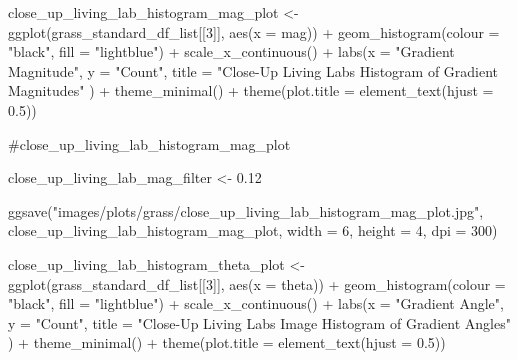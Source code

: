 \documentclass[
  letterpaper,
  DIV=11,
  numbers=noendperiod]{scrreprt}
\newenvironment{Shaded}{\begin{snugshade}}{\end{snugshade}}
\newcommand{\AttributeTok}[1]{\textcolor[rgb]{0.40,0.45,0.13}{#1}}
\newcommand{\CommentTok}[1]{\textcolor[rgb]{0.37,0.37,0.37}{#1}}
\newcommand{\DecValTok}[1]{\textcolor[rgb]{0.68,0.00,0.00}{#1}}
\newcommand{\FloatTok}[1]{\textcolor[rgb]{0.68,0.00,0.00}{#1}}
\newcommand{\FunctionTok}[1]{\textcolor[rgb]{0.28,0.35,0.67}{#1}}
\newcommand{\NormalTok}[1]{\textcolor[rgb]{0.00,0.23,0.31}{#1}}
\newcommand{\OtherTok}[1]{\textcolor[rgb]{0.00,0.23,0.31}{#1}}
\newcommand{\SpecialCharTok}[1]{\textcolor[rgb]{0.37,0.37,0.37}{#1}}
\newcommand{\StringTok}[1]{\textcolor[rgb]{0.13,0.47,0.30}{#1}}
\begin{document}
\begin{Shaded}
\begin{Highlighting}[]
\NormalTok{close\_up\_living\_lab\_histogram\_mag\_plot }\OtherTok{\textless{}{-}}
  \FunctionTok{ggplot}\NormalTok{(grass\_standard\_df\_list[[}\DecValTok{3}\NormalTok{]], }
         \FunctionTok{aes}\NormalTok{(}\AttributeTok{x =}\NormalTok{ mag)) }\SpecialCharTok{+}
  \FunctionTok{geom\_histogram}\NormalTok{(}\AttributeTok{colour =} \StringTok{"black"}\NormalTok{, }\AttributeTok{fill =} \StringTok{"lightblue"}\NormalTok{) }\SpecialCharTok{+}
  \FunctionTok{scale\_x\_continuous}\NormalTok{() }\SpecialCharTok{+} 
  \FunctionTok{labs}\NormalTok{(}\AttributeTok{x =} \StringTok{"Gradient Magnitude"}\NormalTok{, }
       \AttributeTok{y =} \StringTok{"Count"}\NormalTok{, }
       \AttributeTok{title =} \StringTok{"Close{-}Up Living Labs Histogram of Gradient Magnitudes"}
\NormalTok{       ) }\SpecialCharTok{+}
  \FunctionTok{theme\_minimal}\NormalTok{() }\SpecialCharTok{+}
  \FunctionTok{theme}\NormalTok{(}\AttributeTok{plot.title =} \FunctionTok{element\_text}\NormalTok{(}\AttributeTok{hjust =} \FloatTok{0.5}\NormalTok{))}

\CommentTok{\#close\_up\_living\_lab\_histogram\_mag\_plot}

\NormalTok{close\_up\_living\_lab\_mag\_filter }\OtherTok{\textless{}{-}} \FloatTok{0.12}

\FunctionTok{ggsave}\NormalTok{(}\StringTok{"images/plots/grass/close\_up\_living\_lab\_histogram\_mag\_plot.jpg"}\NormalTok{, close\_up\_living\_lab\_histogram\_mag\_plot, }\AttributeTok{width =} \DecValTok{6}\NormalTok{, }\AttributeTok{height =} \DecValTok{4}\NormalTok{, }\AttributeTok{dpi =} \DecValTok{300}\NormalTok{)}



\NormalTok{close\_up\_living\_lab\_histogram\_theta\_plot }\OtherTok{\textless{}{-}}
  \FunctionTok{ggplot}\NormalTok{(grass\_standard\_df\_list[[}\DecValTok{3}\NormalTok{]], }
         \FunctionTok{aes}\NormalTok{(}\AttributeTok{x =}\NormalTok{ theta)) }\SpecialCharTok{+}
  \FunctionTok{geom\_histogram}\NormalTok{(}\AttributeTok{colour =} \StringTok{"black"}\NormalTok{, }\AttributeTok{fill =} \StringTok{"lightblue"}\NormalTok{) }\SpecialCharTok{+}
  \FunctionTok{scale\_x\_continuous}\NormalTok{() }\SpecialCharTok{+} 
  \FunctionTok{labs}\NormalTok{(}\AttributeTok{x =} \StringTok{"Gradient Angle"}\NormalTok{, }
       \AttributeTok{y =} \StringTok{"Count"}\NormalTok{, }
       \AttributeTok{title =} \StringTok{"Close{-}Up Living Labs Image Histogram of Gradient Angles"}
\NormalTok{       ) }\SpecialCharTok{+}
  \FunctionTok{theme\_minimal}\NormalTok{() }\SpecialCharTok{+}
  \FunctionTok{theme}\NormalTok{(}\AttributeTok{plot.title =} \FunctionTok{element\_text}\NormalTok{(}\AttributeTok{hjust =} \FloatTok{0.5}\NormalTok{))}


\end{Highlighting}
\end{Shaded}
\end{document}
